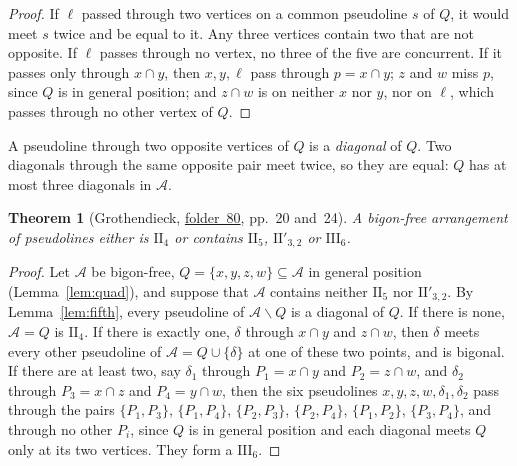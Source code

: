 \documentclass[11pt,a4paper]{amsart}
\newtheorem{theorem}{Theorem}
\theoremstyle{definition}
\theoremstyle{remark}
\newcommand{\II}[1]{\mathrm{II}_{#1}}
\newcommand{\IIp}{\mathrm{II}'_{3,2}}
\newcommand{\III}{\mathrm{III}_{6}}
\newcommand{\A}{\mathcal A}
\newcommand{\fac}[1]{\href{https://grothendieck.umontpellier.fr/#1.pdf}{folder~#1}}
\begin{document}
\begin{proof}
If $\ell$ passed through two vertices on a common pseudoline $s$ of $Q$, it would meet $s$ twice and be equal to it. Any three vertices contain two that are not opposite. If $\ell$ passes through no vertex, no three of the five are concurrent. If it passes only through $x \cap y$, then $x, y, \ell$ pass through $p = x \cap y$; $z$ and $w$ miss $p$, since $Q$ is in general position; and $z \cap w$ is on neither $x$ nor $y$, nor on $\ell$, which passes through no other vertex of $Q$.
\end{proof}

A pseudoline through two opposite vertices of $Q$ is a \emph{diagonal} of $Q$. Two diagonals through the same opposite pair meet twice, so they are equal: $Q$ has at most three diagonals in $\A$.

\begin{theorem}[Grothendieck, {\fac{80}}, pp.~20 and~24]\label{thm:main}
A bigon-free arrangement of pseudolines either is $\II4$ or contains $\II5$, $\IIp$ or $\III$.
\end{theorem}

\begin{proof}
Let $\A$ be bigon-free, $Q = \{x,y,z,w\} \subseteq \A$ in general position (Lemma~\ref{lem:quad}), and suppose that $\A$ contains neither $\II5$ nor $\IIp$. By Lemma~\ref{lem:fifth}, every pseudoline of $\A \smallsetminus Q$ is a diagonal of $Q$. If there is none, $\A = Q$ is $\II4$. If there is exactly one, $\delta$ through $x \cap y$ and $z \cap w$, then $\delta$ meets every other pseudoline of $\A = Q \cup \{\delta\}$ at one of these two points, and is bigonal. If there are at least two, say $\delta_1$ through $P_1 = x \cap y$ and $P_2 = z \cap w$, and $\delta_2$ through $P_3 = x \cap z$ and $P_4 = y \cap w$, then the six pseudolines $x, y, z, w, \delta_1, \delta_2$ pass through the pairs $\{P_1, P_3\}$, $\{P_1, P_4\}$, $\{P_2, P_3\}$, $\{P_2, P_4\}$, $\{P_1, P_2\}$, $\{P_3, P_4\}$, and through no other $P_i$, since $Q$ is in general position and each diagonal meets $Q$ only at its two vertices. They form a $\III$.
\end{proof}
\end{document}
